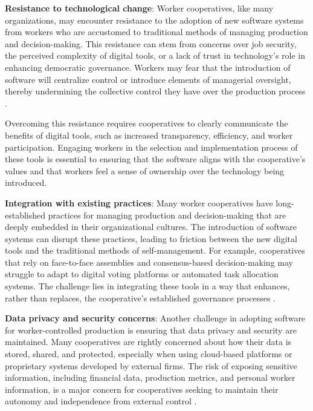 \begin{refsection}
\textbf{Resistance to technological change}: Worker cooperatives, like many organizations, may encounter resistance to the adoption of new software systems from workers who are accustomed to traditional methods of managing production and decision-making. This resistance can stem from concerns over job security, the perceived complexity of digital tools, or a lack of trust in technology’s role in enhancing democratic governance. Workers may fear that the introduction of software will centralize control or introduce elements of managerial oversight, thereby undermining the collective control they have over the production process \cite[pp.~95-98]{sitrin2012}.

Overcoming this resistance requires cooperatives to clearly communicate the benefits of digital tools, such as increased transparency, efficiency, and worker participation. Engaging workers in the selection and implementation process of these tools is essential to ensuring that the software aligns with the cooperative’s values and that workers feel a sense of ownership over the technology being introduced.

\textbf{Integration with existing practices}: Many worker cooperatives have long-established practices for managing production and decision-making that are deeply embedded in their organizational cultures. The introduction of software systems can disrupt these practices, leading to friction between the new digital tools and the traditional methods of self-management. For example, cooperatives that rely on face-to-face assemblies and consensus-based decision-making may struggle to adapt to digital voting platforms or automated task allocation systems. The challenge lies in integrating these tools in a way that enhances, rather than replaces, the cooperative’s established governance processes \cite[pp.~178-181]{restakis2012}.

\textbf{Data privacy and security concerns}: Another challenge in adopting software for worker-controlled production is ensuring that data privacy and security are maintained. Many cooperatives are rightly concerned about how their data is stored, shared, and protected, especially when using cloud-based platforms or proprietary systems developed by external firms. The risk of exposing sensitive information, including financial data, production metrics, and personal worker information, is a major concern for cooperatives seeking to maintain their autonomy and independence from external control \cite[pp.~121-125]{tapscott2016}.


\end{refsection}
